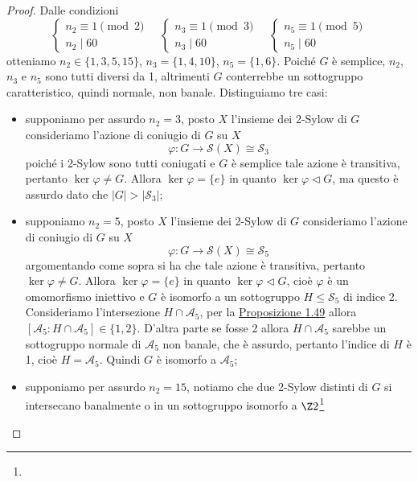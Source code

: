 \documentclass[11pt]{scrartcl}
\begin{document}
	\begin{proof}
		Dalle condizioni
		\[
		\begin{cases}
			n_2 \equiv 1 \pmod 2\\
			n_2 \mid 60
		\end{cases}
		\quad
		\begin{cases}
			n_3 \equiv 1 \pmod 3\\
			n_3 \mid 60
		\end{cases}
		\quad
		\begin{cases}
			n_5 \equiv 1 \pmod 5\\
			n_5 \mid 60
		\end{cases}
		\]
		otteniamo $n_2 \in \{1, 3, 5, 15\}$, $n_3 = \{1, 4, 10\}$, $n_5 = \{1, 6\}$.
		Poiché $G$ è semplice, $n_2$, $n_3$ e $n_5$ sono tutti diversi da 1,
		altrimenti $G$ conterrebbe un sottogruppo caratteristico, quindi normale,
		non banale. Distinguiamo tre casi:
		\begin{itemize}
			\item supponiamo per assurdo $n_2 = 3$, posto $X$ l'insieme dei 2-Sylow di $G$
			consideriamo l'azione di coniugio di $G$ su $X$
			\[
			\varphi: G \longrightarrow \mathcal{S}(X) \cong \mathcal{S}_3
			\]
			poiché i 2-Sylow sono tutti coniugati e $G$ è semplice tale azione è 
			transitiva, pertanto $\ker\varphi \neq G$. Allora $\ker\varphi = \{e\}$ 
			in quanto $\ker\varphi\triangleleft G$,
			ma questo è assurdo dato che $|G| > |\mathcal{S}_3|$;
			\item supponiamo $n_2 = 5$, posto $X$ l'insieme dei 2-Sylow di $G$
			consideriamo l'azione di coniugio di $G$ su $X$
			\[
			\varphi: G \longrightarrow \mathcal{S}(X) \cong \mathcal{S}_5
			\]
			argomentando come sopra si ha che tale azione è transitiva, pertanto
			$\ker\varphi \neq G$. Allora $\ker\varphi = \{e\}$ in quanto 
			$\ker\varphi \triangleleft G$, cioè $\varphi$ è un omomorfismo iniettivo
			e $G$ è isomorfo a un sottogruppo $H\leqslant \mathcal{S}_5$ di indice 2. Consideriamo
			l'intersezione $H \cap \mathcal{A}_5$, per la \hyperref[prop1.49]{Proposizione 1.49}
			allora $[\mathcal{A}_5:H\cap\mathcal{A}_5] \in \{1, 2\}$. D'altra parte
			se fosse 2 allora $H\cap\mathcal{A}_5$ sarebbe un sottogruppo normale di $\mathcal{A}_5$
			non banale, che è assurdo, pertanto l'indice di $H$ è 1, cioè $H = \mathcal{A}_5$.
			Quindi $G$ è isomorfo a $\mathcal{A}_5$;
			\item supponiamo per assurdo $n_2 = 15$, notiamo che due 2-Sylow distinti
			di $G$ si intersecano banalmente 
			o in un sottogruppo isomorfo a $\Z2$\footnote{
}
\end{itemize}
\end{proof}
\end{document}
